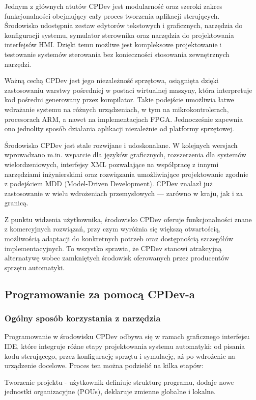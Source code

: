 \documentclass[12pt,twoside]{article}
\begin{document}
Jednym z głównych atutów CPDev jest modularność oraz szeroki zakres funkcjonalności obejmujący cały proces tworzenia aplikacji sterujących. Środowisko udostępnia zestaw edytorów tekstowych i graficznych, narzędzia do konfiguracji systemu, symulator sterownika oraz narzędzia do projektowania interfejsów HMI. Dzięki temu możliwe jest kompleksowe projektowanie i testowanie systemów sterowania bez konieczności stosowania zewnętrznych narzędzi.

Ważną cechą CPDev jest jego niezależność sprzętowa, osiągnięta dzięki zastosowaniu warstwy pośredniej w postaci wirtualnej maszyny, która interpretuje kod pośredni generowany przez kompilator. Takie podejście umożliwia łatwe wdrażanie systemu na różnych urządzeniach, w tym na mikrokontrolerach, procesorach ARM, a nawet na implementacjach FPGA. Jednocześnie zapewnia ono jednolity sposób działania aplikacji niezależnie od platformy sprzętowej.

Środowisko CPDev jest stale rozwijane i udoskonalane. W kolejnych wersjach wprowadzano m.in. wsparcie dla języków graficznych, rozszerzenia dla systemów wielordzeniowych, interfejsy XML pozwalające na współpracę z innymi narzędziami inżynierskimi oraz rozwiązania umożliwiające projektowanie zgodnie z podejściem MDD (Model-Driven Development). CPDev znalazł już zastosowanie w wielu wdrożeniach przemysłowych — zarówno w kraju, jak i za granicą.

Z punktu widzenia użytkownika, środowisko CPDev oferuje funkcjonalności znane z komercyjnych rozwiązań, przy czym wyróżnia się większą otwartością, możliwością adaptacji do konkretnych potrzeb oraz dostępnością szczegółów implementacyjnych. To wszystko sprawia, że CPDev stanowi atrakcyjną alternatywę wobec zamkniętych środowisk oferowanych przez producentów sprzętu automatyki.
\subsection{Programowanie za pomocą CPDev-a}
\subsubsection{Ogólny sposób korzystania z narzędzia}
Programowanie w środowisku CPDev odbywa się w ramach graficznego interfejsu IDE, które integruje różne etapy projektowania systemu automatyki: od pisania kodu sterującego, przez konfigurację sprzętu i symulację, aż po wdrożenie na urządzenie docelowe. Proces ten można podzielić na kilka etapów:

Tworzenie projektu - użytkownik definiuje strukturę programu, dodaje nowe jednostki organizacyjne (POUs), deklaruje zmienne globalne i lokalne.
\end{document}
